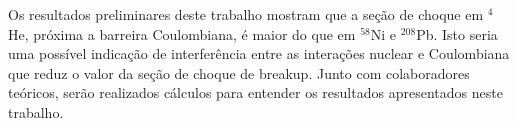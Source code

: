\documentclass[a4paper,12pt,oneside]{book}
\begin{document}
\par Os resultados preliminares deste trabalho mostram que a seção de choque em $^4$He, próxima a barreira Coulombiana, é maior do que em $^{58}$Ni e $^{208}$Pb. Isto seria uma possível indicação de interferência entre as interações nuclear e Coulombiana que reduz o valor da seção de choque de breakup. Junto com colaboradores teóricos, serão realizados cálculos para entender os resultados apresentados neste trabalho.



%
%
%
\end{document}
